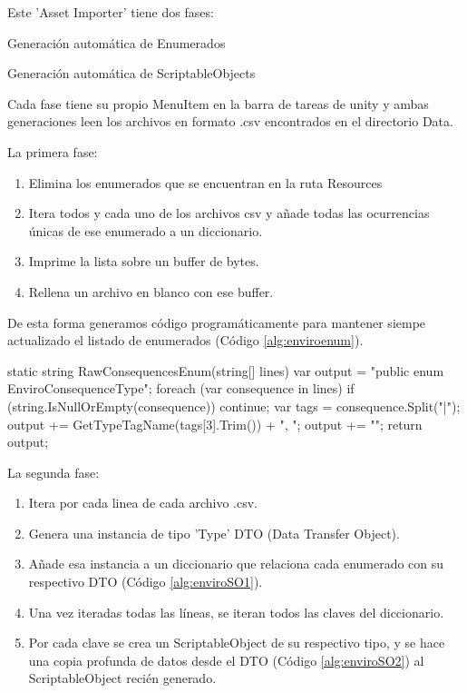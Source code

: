 Este 'Asset Importer' tiene dos fases:
\begin{compactitem}
    \item Generación automática de Enumerados
    \item Generación automática de ScriptableObjects
\end{compactitem}

Cada fase tiene su propio MenuItem en la barra de tareas de unity y ambas generaciones leen los archivos en formato .csv encontrados en el directorio \textunderscore Data. 

La primera fase:
\begin{enumerate}
    \item Elimina los enumerados que se encuentran en la ruta Resources
    \item Itera todos y cada uno de los archivos csv y añade todas las ocurrencias únicas de ese enumerado a un diccionario.
    \item Imprime la lista sobre un buffer de bytes.
    \item Rellena un archivo en blanco con ese buffer.
\end{enumerate} 

De esta forma generamos código programáticamente para mantener siempe actualizado el listado de enumerados (Código \ref{alg:enviroenum}).

\begin{mypython}[caption={Código para autogenerar el enumerado de EnviroConsequences.},label={alg:enviroenum}]
static string RawConsequencesEnum(string[] lines)
{
    var output = "public enum EnviroConsequenceType{";
    foreach (var consequence in lines)
    {
        if (string.IsNullOrEmpty(consequence))
        {
            continue;
        }
        var tags = consequence.Split("|");
        output += GetTypeTagName(tags[3].Trim()) + ", ";
    }
    output += "}";
    return output;
}
\end{mypython}

La segunda fase:
\begin{enumerate}
    \item Itera por cada linea de cada archivo .csv.
    \item Genera una instancia de tipo 'Type' DTO (Data Transfer Object).
    \item Añade esa instancia a un diccionario que relaciona cada enumerado con su respectivo DTO (Código \ref{alg:enviroSO1}). 
    \item Una vez iteradas todas las líneas, se iteran todos las claves del diccionario.
    \item Por cada clave se crea un ScriptableObject de su respectivo tipo, y se hace una copia profunda de datos desde el DTO (Código \ref{alg:enviroSO2}) al ScriptableObject recién generado.
\end{enumerate} 

